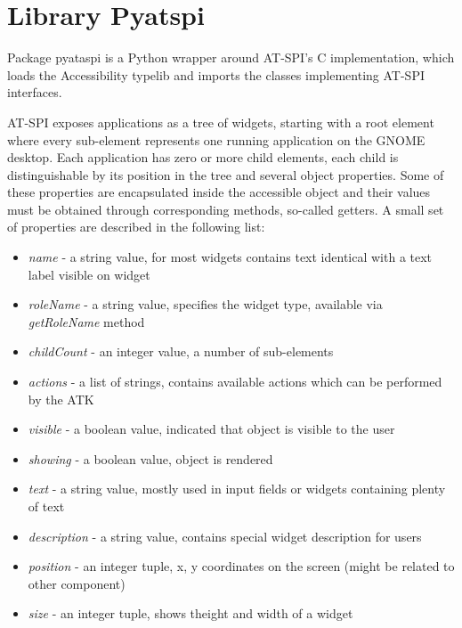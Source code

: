 \newpage
\section{Library Pyatspi}\label{library_pyatspi}
Package pyataspi is a Python wrapper around AT-SPI's C implementation, which loads the Accessibility typelib and imports the classes implementing AT-SPI interfaces.\cite{pyatspi}

AT-SPI exposes applications as a tree of widgets, starting with a root element where every sub-element represents one running application on the GNOME desktop. Each application has zero or more child elements, each child is distinguishable by its position in the tree and several object properties. Some of these properties are encapsulated inside the accessible object and their values must be obtained through corresponding methods, so-called getters. A small set of properties are described in the following list:
\begin{itemize}
    \item \textit{name} - a string value, for most widgets contains text identical with a text label visible on widget
    \item \textit{roleName} - a string value, specifies the widget type, available via \textit{getRoleName} method
    \item \textit{childCount} - an integer value, a number of sub-elements 
    \item \textit{actions} - a list of strings, contains available actions which can be performed by the ATK
    \item \textit{visible} - a boolean value, indicated that object is visible to the user
    \item \textit{showing} - a boolean value, object is rendered
    \item \textit{text} - a string value, mostly used in input fields or widgets containing plenty of text
    \item \textit{description} - a string value, contains special widget description for users
    \item \textit{position} - an integer tuple, x, y coordinates on the screen (might be related to other component)
    \item \textit{size} - an integer tuple, shows theight and width of a widget
\end{itemize}

